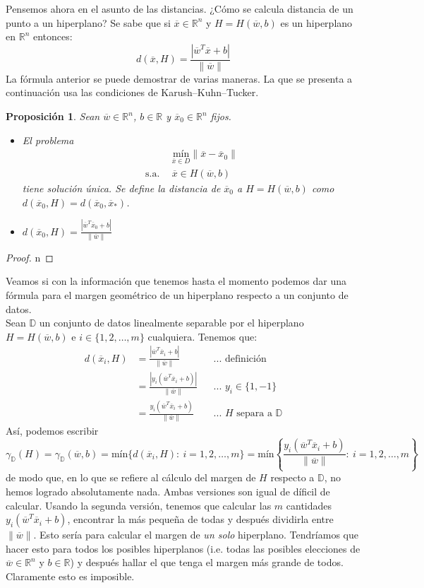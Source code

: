 \documentclass[11pt]{article}
\newtheorem{proposition}{Proposición}[section]
\newcommand{\Rn}{\mathbb{R}^{n}}
\newcommand{\R}{\mathbb{R}}
\newcommand{\wv}{\overline{w}}
\newcommand{\x}{\overline{x}}
\newcommand{\xz}{\overline{x}_{0}}
\newcommand{\Sm}{1,2,\ldots, m}
\newcommand{\xo}{\overline{x}_{*}}
\newcommand{\Dat}{\mathbb{D}}
\newcommand{\nw}{\|\wv\|}
\begin{document}
Pensemos ahora en el asunto de las distancias. ¿Cómo se calcula distancia de un punto a un hiperplano? Se sabe que si $\x\in\Rn$ y $H=H(\wv, b)$ es un hiperplano en $\Rn$ entonces:
$$d(\x, H)=\frac{|\wv^{T}\x+b|}{\|\wv\|}$$
La fórmula anterior se puede demostrar de varias maneras. La que se presenta a continuación usa las condiciones de Karush--Kuhn--Tucker.
\begin{proposition}
Sean $\wv\in\Rn$, $b\in\R$ y $\xz\in\Rn$ fijos.
\begin{itemize}
\item[(i)] El problema
\begin{equation*}
\begin{aligned}
& \underset{\x\in D}{\text{mín}} \|\x-\xz\| \\
\text{s.a.}\ \
& \x\in H(\wv, b)
\end{aligned}
\end{equation*}
tiene solución única. Se define la distancia de $\xz$ a $H=H(\wv, b)$ como $d(\xz, H)= d(\xz,\xo)$.
\item[(ii)] $d(\xz, H)=\frac{|\wv^{T}\xz+b|}{\nw}$
\end{itemize}
\end{proposition}
\begin{proof}
n
\end{proof}

Veamos si con la información que tenemos hasta el momento podemos dar una fórmula para el margen geométrico de un hiperplano respecto a un conjunto de datos.\\
Sean $\Dat$ un conjunto de datos linealmente separable por el hiperplano $H=H(\wv, b)$ e $i\in\{1,2,\ldots,m\}$ cualquiera. Tenemos que:
\begin{equation*}
\begin{aligned}
d(\x_{i}, H)&=\frac{|\wv^{T}\x_{i}+b|}{\nw} &&\text{... definición}\\
&=\frac{|y_{i}(\wv^{T}\x_{i}+b)|}{\nw} &&\text{... $y_{i}\in\{1,-1\}$}\\
&=\frac{y_{i}(\wv^{T}\x_{i}+b)}{\nw} &&\text{... $H$ separa a $\Dat$}
\end{aligned}
\end{equation*}
Así, podemos escribir
$$\gamma_{\Dat}(H)=\gamma_{\Dat}(\wv, b)=\text{mín}\{d(\x_{i}, H):\ i=\Sm\}=\text{mín}\left\{\frac{y_{i}(\wv^{T}\x_{i}+b)}{\nw}:\ i=\Sm\right\}$$
de modo que, en lo que se refiere al cálculo del margen de $H$ respecto a $\Dat$, no hemos logrado absolutamente nada. Ambas versiones son igual de díficil de calcular. Usando la segunda versión, tenemos que calcular las $m$ cantidades $y_{i}(\wv ^{T}\x_{i}+b)$, encontrar la más pequeña de todas y después dividirla entre $\nw$. Esto sería para calcular el margen de \emph{un solo} hiperplano. Tendríamos que hacer esto para todos los posibles hiperplanos (i.e. todas las posibles elecciones de $\wv\in\Rn$ y $b\in\R$) y después hallar el que tenga el margen más grande de todos. Claramente esto es imposible.\\
\end{document}
